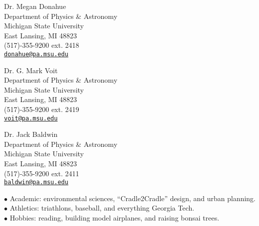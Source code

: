 \documentclass[11pt]{cv}
\begin{document}
\begin{llist}


{\sc Dr. Megan Donahue}\\
Department of Physics \& Astronomy\\
Michigan State University\\
East Lansing, MI 48823\\
(517)-355-9200 ext. 2418\\
\href{mailto:donahue@pa.msu.edu}{\tt donahue@pa.msu.edu}

{\sc Dr. G. Mark Voit}\\
Department of Physics \& Astronomy\\
Michigan State University\\
East Lansing, MI 48823\\
(517)-355-9200 ext. 2419\\
\href{mailto:voit@pa.msu.edu}{\tt voit@pa.msu.edu}

{\sc Dr. Jack Baldwin}\\
Department of Physics \& Astronomy\\
Michigan State University\\
East Lansing, MI 48823\\
(517)-355-9200 ext. 2411\\
\href{mailto:baldwin@pa.msu.edu}{\tt baldwin@pa.msu.edu}


$\bullet$ Academic: environmental sciences, ``Cradle2Cradle'' design, and urban planning.\\
$\bullet$ Athletics: triathlons, baseball, and everything Georgia Tech.\\
$\bullet$ Hobbies: reading, building model airplanes, and raising bonsai trees.\\

\end{llist}
\end{document}
